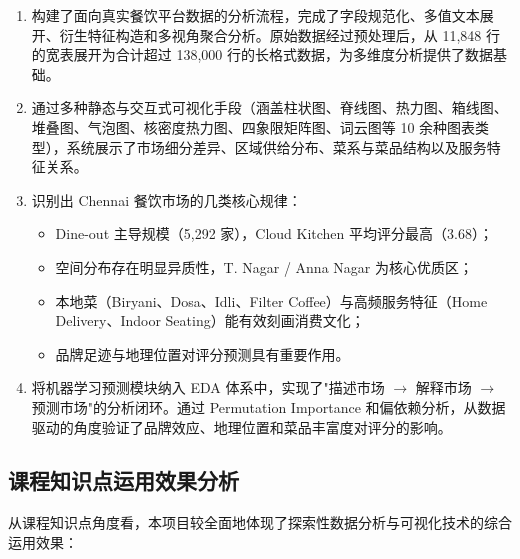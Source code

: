 \documentclass[11pt,a4paper]{article}
\begin{document}
\begin{enumerate}[leftmargin=2em]
    \item 构建了面向真实餐饮平台数据的分析流程，完成了字段规范化、多值文本展开、衍生特征构造和多视角聚合分析。原始数据经过预处理后，从 11,848 行的宽表展开为合计超过 138,000 行的长格式数据，为多维度分析提供了数据基础。

    \item 通过多种静态与交互式可视化手段（涵盖柱状图、脊线图、热力图、箱线图、堆叠图、气泡图、核密度热力图、四象限矩阵图、词云图等 10 余种图表类型），系统展示了市场细分差异、区域供给分布、菜系与菜品结构以及服务特征关系。

    \item 识别出 Chennai 餐饮市场的几类核心规律：
    \begin{itemize}[leftmargin=1.5em]
        \item Dine-out 主导规模（5,292 家），Cloud Kitchen 平均评分最高（3.68）；
        \item 空间分布存在明显异质性，T. Nagar / Anna Nagar 为核心优质区；
        \item 本地菜（Biryani、Dosa、Idli、Filter Coffee）与高频服务特征（Home Delivery、Indoor Seating）能有效刻画消费文化；
        \item 品牌足迹与地理位置对评分预测具有重要作用。
    \end{itemize}

    \item 将机器学习预测模块纳入 EDA 体系中，实现了"描述市场 $\rightarrow$ 解释市场 $\rightarrow$ 预测市场"的分析闭环。通过 Permutation Importance 和偏依赖分析，从数据驱动的角度验证了品牌效应、地理位置和菜品丰富度对评分的影响。
\end{enumerate}

\subsection{课程知识点运用效果分析}

从课程知识点角度看，本项目较全面地体现了探索性数据分析与可视化技术的综合运用效果：
\end{document}
